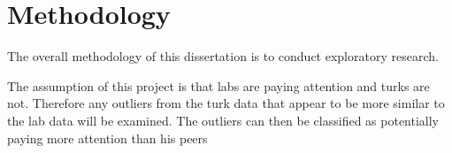 \documentclass{article}
\begin{document}









\section{Methodology}

The overall methodology of this dissertation is to conduct exploratory research.

The assumption of this project is that labs are paying attention and turks are not.
Therefore any outliers from the turk data that appear to be more similar to the lab data will be examined.
The outliers can then be classified as potentially paying more attention than his peers
\end{document}
